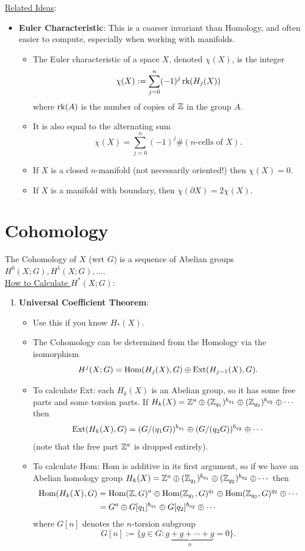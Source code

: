 \documentclass{amsart}
\begin{document}
	\underline{Related Ideas}:
	\begin{itemize}
		\item \textbf{Euler Characteristic}: This is a coarser invariant than Homology, and often easier to compute, especially when working with manifolds.
		\begin{itemize}
		\item The Euler characteristic of a space $X$, denoted $\chi(X)$, is the integer
		$$
		\chi(X) := \sum_{j=0}^n (-1)^j \operatorname{rk}(H_j(X))
		$$
		where $\operatorname{rk}(A)$ is the number of copies of $\mathbb{Z}$ in the group $A$.
		\item It is also equal to the alternating sum
		$$
		\chi(X) = \sum_{j=0}^n (-1)^j \#(\text{$n$-cells of $X$}).
		$$
		\item If $X$ is a closed $n$-manifold (not necessarily oriented!) then $\chi(X)=0$.
		\item If $X$ is a manifold with boundary, then $\chi(\partial X)=2\chi(X)$. 
		\end{itemize}
	\end{itemize}
	
	\newpage
	\section{Cohomology}
	
	The Cohomology of $X$ (wrt $G$) is a sequence of Abelian groups $H^0(X;G),H^1(X;G),\dots$.\\
	
	\underline{How to Calculate $H^*(X;G)$}:
	\begin{enumerate}[(I)]
		\item \textbf{Universal Coefficient Theorem}:
		\begin{itemize}
			\item Use this if you know $H_*(X)$.
			\item The Cohomology can be determined from the Homology via the isomorphism
			$$
			H^j(X;G) = \operatorname{Hom}(H_j(X),G)\oplus \operatorname{Ext}(H_{j-1}(X),G).
			$$
			\item To calculate Ext: each $H_k(X)$ is an Abelian group, so it has some free parts and some torsion parts. If $H_k(X)=\mathbb{Z}^a \oplus (\mathbb{Z}_{q_1})^{b_{q_1}}\oplus (\mathbb{Z}_{q_2})
			^{b_{q_2}} \oplus \cdots $ then 
			$$
			\operatorname{Ext}(H_k(X),G) = (G/(q_1G))^{b_{q_1}} \oplus (G/(q_2G))^{b_{q_2}}\oplus \cdots
			$$
			(note that the free part $\mathbb{Z}^a$ is dropped entirely).
			\item To calculate Hom: Hom is additive in its first argument, so if we have an Abelian homology group $H_k(X)=\mathbb{Z}^a \oplus (\mathbb{Z}_{q_1})^{b_{q_1}}\oplus (\mathbb{Z}_{q_2})
			^{b_{q_2}} \oplus \cdots $ then
			\begin{align*}
			\operatorname{Hom}(H_k(X),G) &= \operatorname{Hom}(\mathbb{Z},G)^a \oplus \operatorname{Hom}(\mathbb{Z}_{q_1},G)^{q_1}\oplus \operatorname{Hom}(\mathbb{Z}_{q_2},G)^{q_2}\oplus \cdots\\
			&= G^a \oplus G[q_1]^{b_{q_1}} \oplus G[q_2]^{b_{q_2}} \oplus \cdots 
			\end{align*}
			where $G[n]$ denotes the $n$-torsion subgroup
			$$
			G[n] := \{g\in G : \underbrace{g + g + \cdots + g}_{n} = 0\}.
			$$
		\end{itemize}
	\end{enumerate}
		
\end{document}
